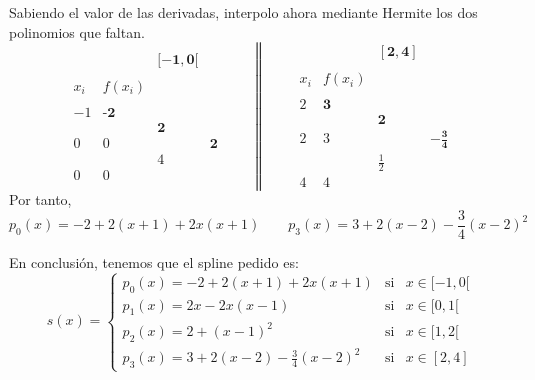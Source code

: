 \begin{ejercicio}
    Sabiendo el valor de las derivadas, interpolo ahora mediante Hermite los dos polinomios que faltan.
    \begin{equation*}
        \begin{array}{c|ccc}
            &&\mathbf{[-1,0[} \\ \\
            x_i & f(x_i) \\ \\
            -1 & \textbf{-2} \\
            && \textbf{2} \\ 
            0 & 0 && \textbf{2}\\
            && 4\\
            0 & 0
        \end{array}
        \qquad \left\|\qquad
        \begin{array}{c|ccc}
            &&\mathbf{[2,4]} \\ \\
            x_i & f(x_i) \\ \\
            2 & \textbf{3} \\
            && \textbf{2} \\ 
            2 & 3 && \mathbf{-\frac{3}{4}}\\
            && \frac{1}{2}\\
            4 & 4
        \end{array}\right.
    \end{equation*}
    Por tanto,
    \begin{equation*}
        p_0(x)=-2+2(x+1)+2x(x+1) \qquad p_3(x)=3+2(x-2) -\frac{3}{4}(x-2)^2
    \end{equation*}

    En conclusión, tenemos que el spline pedido es:
    \begin{equation*}
        s(x)=\left\{\begin{array}{lll}
            p_0(x)=-2+2(x+1)+2x(x+1) & \text{si} & x\in [-1, 0[ \\
            p_1(x)=2x -2x(x-1) & \text{si} & x\in [0,1[ \\
            p_2(x)=2 +(x-1)^2 & \text{si} & x\in [1,2[ \\
            p_3(x)=3+2(x-2) -\frac{3}{4}(x-2)^2 & \text{si} & x\in [2,4]
        \end{array} \right.
    \end{equation*}
\end{ejercicio}


